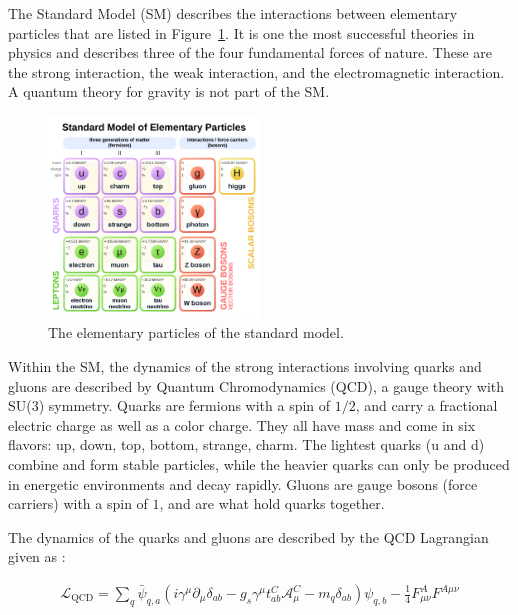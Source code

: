 The Standard Model (SM) \cite{Gaillard:1998ui} describes the interactions between elementary particles that are listed in Figure~\ref{fig:sm_particles}. It is one the most successful theories in physics and describes three of the four fundamental forces of nature. These are the strong interaction, the weak interaction, and the electromagnetic interaction. A quantum theory for gravity is not part of the SM.

\begin{figure}[htbp]
\begin{center}
\includegraphics[width=0.5\textwidth]{figures/theory/SM}
\caption{The elementary particles of the standard model.}
\label{fig:sm_particles}
\end{center}
\end{figure}



Within the SM, the dynamics of the strong interactions involving quarks and gluons are described by Quantum Chromodynamics (QCD), a gauge theory with SU(3) symmetry. Quarks are fermions with a spin of $1/2$, and carry a fractional electric charge as well as a color charge. They all have mass and come in six flavors: up, down, top, bottom, strange, charm. The lightest quarks (u and d) combine and form stable particles, while the heavier quarks can only be produced in energetic environments and decay rapidly. Gluons are gauge bosons (force carriers) with a spin of $1$, and are what hold quarks together.

The dynamics of the quarks and gluons are described by the QCD Lagrangian given as \cite{Beringer:1481544}:

\begin{align}
\mathcal{{L}}_{\mathrm{QCD}} = \sum_q \bar{\psi}_{q,a} (i \gamma^\mu \partial_\mu \delta_{ab} - g_s \gamma^\mu t_{ab}^C \mathcal{A}_\mu^C - m_q \delta_{ab}) \psi_{q,b} - \frac{1}{4} F_{\mu\nu}^A F^{A \mu\nu}
\end{align}


